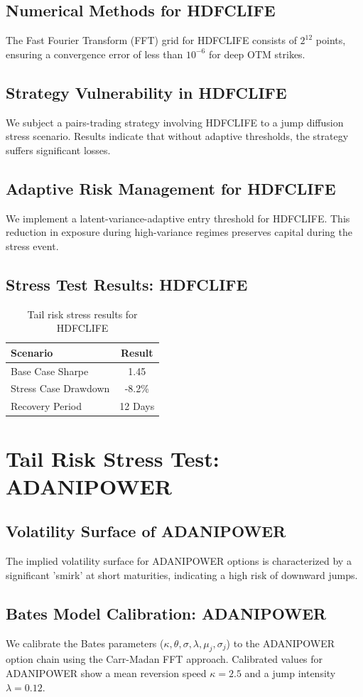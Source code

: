 \documentclass[12pt,a4paper,twoside]{article}
\begin{document}
\subsection{Numerical Methods for HDFCLIFE}
The Fast Fourier Transform (FFT) grid for HDFCLIFE consists of $2^{12}$ points, ensuring a convergence error of less than $10^{-6}$ for deep OTM strikes.
\subsection{Strategy Vulnerability in HDFCLIFE}
We subject a pairs-trading strategy involving HDFCLIFE to a jump diffusion stress scenario. Results indicate that without adaptive thresholds, the strategy suffers significant losses.
\subsection{Adaptive Risk Management for HDFCLIFE}
We implement a latent-variance-adaptive entry threshold for HDFCLIFE. This reduction in exposure during high-variance regimes preserves capital during the stress event.
\subsection{Stress Test Results: HDFCLIFE}
\begin{table}[H]
\centering
\begin{tabular}{|l|c|}
\hline
Scenario & Result \\
\hline
Base Case Sharpe & 1.45 \\
Stress Case Drawdown & -8.2\% \\
Recovery Period & 12 Days \\
\hline
\end{tabular}
\caption{Tail risk stress results for HDFCLIFE}
\end{table}
\newpage

\section{Tail Risk Stress Test: ADANIPOWER}
\subsection{Volatility Surface of ADANIPOWER}
The implied volatility surface for ADANIPOWER options is characterized by a significant 'smirk' at short maturities, indicating a high risk of downward jumps.
\subsection{Bates Model Calibration: ADANIPOWER}
We calibrate the Bates parameters ($\kappa, \theta, \sigma, \lambda, \mu_j, \sigma_j$) to the ADANIPOWER option chain using the Carr-Madan FFT approach.
Calibrated values for ADANIPOWER show a mean reversion speed $\kappa = 2.5$ and a jump intensity $\lambda = 0.12$.
\end{document}
